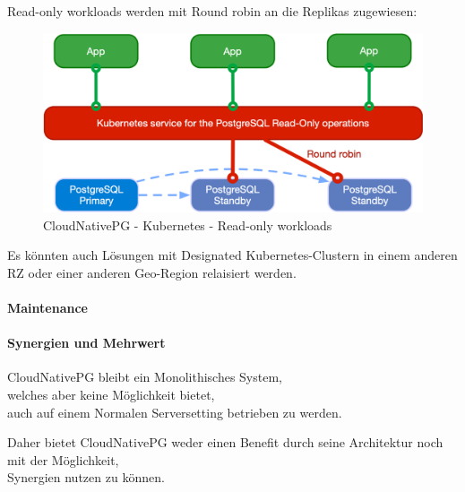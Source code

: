 \begin{flushleft}
    Read-only workloads werden mit Round robin an die Replikas zugewiesen:
    \begin{figure}[H]
        \centering
        \includegraphics[width=0.75\linewidth]{source/implementation/evaluation/postgresql_ha_solutions/cloudnativepg/cloudnativepg-architecture-read-only}
        \caption{CloudNativePG - Kubernetes - Read-only workloads}
        \label{fig:cloudnativepg-architecture-read-only}
    \end{figure}
\end{flushleft}
\begin{flushleft}
    Es könnten auch Lösungen mit Designated Kubernetes-Clustern in einem anderen RZ oder einer anderen Geo-Region relaisiert werden.
\end{flushleft}
\begin{flushleft}
    \paragraph{Maintenance}
\end{flushleft}
\begin{flushleft}
    \paragraph{Synergien und Mehrwert}
    CloudNativePG bleibt ein Monolithisches System,\\welches aber keine Möglichkeit bietet,\\auch auf einem Normalen Serversetting betrieben zu werden.
\end{flushleft}
\begin{flushleft}
    Daher bietet CloudNativePG weder einen Benefit durch seine Architektur noch mit der Möglichkeit,\\Synergien nutzen zu können.
\end{flushleft}
